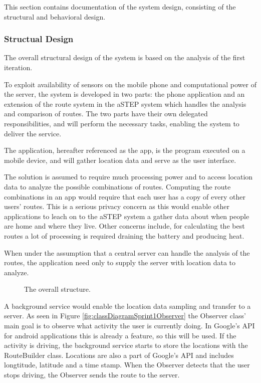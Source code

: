 This section contains documentation of the system design, consisting of the structural and behavioral design.

\subsubsection{Structual Design}
The overall structural design of the system is based on the analysis of the first iteration.

To exploit availability of sensors on the mobile phone and computational power of the server, the system is developed in two parts: the phone application and an extension of the route system in the aSTEP system which handles the analysis and comparison of routes.
The two parts have their own delegated responsibilities, and will perform the necessary tasks, enabling the system to deliver the service.

The application, hereafter referenced as the app, is the program executed on a mobile device, and will gather location data and serve as the user interface. 

The solution is assumed to require much processing power and to access location data to analyze the possible combinations of routes.
Computing the route combinations in an app would require that each user has a copy of every other users' routes.
This is a serious privacy concern as this would enable other applications to leach on to the aSTEP system a gather data about when people are home and where they live.
Other concerns include, for calculating the best routes a lot of processing is required draining the battery and producing heat.

When under the assumption that a central server can handle the analysis of the routes, the application need only to supply the server with location data to analyze.

\begin{figure}[h]
	\centering
	
	\caption{The overall structure.}
	\label{fig:packageDiagramSprint1}
\end{figure}

A background service would enable the location data sampling and transfer to a server.
As seen in Figure \ref{fig:classDiagramSprint1Observer} the Observer class' main goal is to observe what activity the user is currently doing.
In Google's API for android applications this is already a feature, so this will be used.
If the activity is driving, the background service starts to store the locations with the RouteBuilder class.
Locations are also a part of Google's API and includes longtitude, latitude and a time stamp.
When the Observer detects that the user stops driving, the Observer sends the route to the server.

